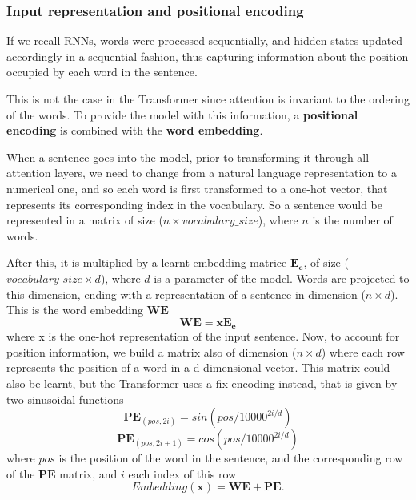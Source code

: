 \documentclass[11pt,english,listoffigures,listoftables]{tfgetsinf}
\newcommand{\vect}[1]{\mathbf{#1}}
\begin{document}
\subsubsection{Input representation and positional encoding}\label{inputrep}

If we recall RNNs, words were processed sequentially, and hidden states updated accordingly in a sequential fashion, thus capturing information about the position occupied by each word in the sentence. 

This is not the case in the Transformer since attention is invariant to the ordering of the words. To provide the model with this information, a \textbf{positional encoding} is combined with the \textbf{word embedding}.

When a sentence goes into the model, prior to transforming it through all attention layers, we need to change from a natural language representation to a numerical one, and so each word is first transformed to a one-hot vector, that represents its corresponding index in the vocabulary. So a sentence would be represented in a matrix of size ($n \times vocabulary\_size$), where $n$ is the number of words.

After this, it is multiplied by a learnt embedding matrice $\vect{E_e}$, of size ($vocabulary\_size \times d$), where $d$ is a parameter of the model. Words are projected to this dimension, ending with a representation of a sentence in dimension ($n \times d$). This is the word embedding $\vect{WE}$
\begin{equation}
    \vect{WE} = \vect{x} \vect{E_e}
\end{equation}
where x is the one-hot representation of the input sentence.
Now, to account for position information, we build a matrix also of dimension ($n \times d$) where each row represents the position of a word in a d-dimensional vector. This matrix could also be learnt, but the Transformer uses a fix encoding instead, that is given by two sinusoidal functions
\begin{equation}
    \vect{PE}_{(pos,2i)} = sin(pos/10000^{2i/d})
\end{equation}
\begin{equation}
    \vect{PE}_{(pos,2i+1)} = cos(pos/10000^{2i/d})
\end{equation}
where $pos$ is the position of the word in the sentence, and the corresponding row of the $\vect{PE}$ matrix, and $i$ each index of this row
\begin{equation}
    Embedding(\vect{x}) = \vect{WE} + \vect{PE}.
\end{equation}
\end{document}

